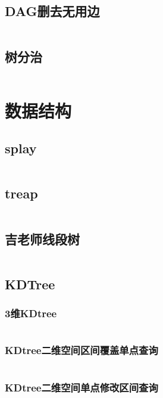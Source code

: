 \documentclass{article}
\begin{document}
\subsection{DAG删去无用边} %
\inputminted[breaklines]{c++}{../图论/DAG删去无用边.cpp} %

\subsection{树分治} %
\inputminted[breaklines]{c++}{../图论/树分治.cpp} %

\newpage
\section{数据结构}
\subsection{splay}
\inputminted[breaklines]{c++}{../数据结构/splay.cpp}

\subsection{treap}
\inputminted[breaklines]{c++}{../数据结构/treap.cpp}

\subsection{吉老师线段树}
\inputminted[breaklines]{c++}{../数据结构/吉老师线段树.cpp}

\subsection{KDTree}
\subsubsection{3维KDtree}
\inputminted[breaklines]{c++}{../数据结构/3维KDtree.cpp}

\subsubsection{KDtree二维空间区间覆盖单点查询}
\inputminted[breaklines]{c++}{../数据结构/KDtree二维空间区间覆盖单点查询.cpp}

\subsubsection{KDtree二维空间单点修改区间查询}
\inputminted[breaklines]{c++}{../数据结构/KDtree二维空间单点修改区间查询.cpp}
\end{document}
